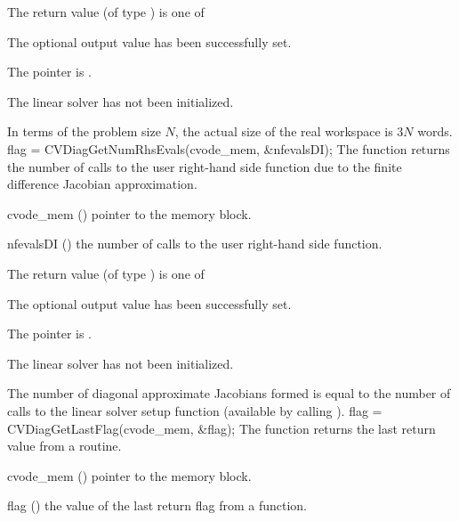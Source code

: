 {
  The return value  (of type ) is one of
  \begin{args}
  \item[\Id{CVDIAG\_SUCCESS}] 
    The optional output value has been successfully set.
  \item[\Id{CVDIAG\_MEM\_NULL}]
    The  pointer is .
  \item[\Id{CVDIAG\_LMEM\_NULL}]
    The {\cvdiag} linear solver has not been initialized.
  \end{args}
}
{
  In terms of the problem size $N$, the actual size of the real workspace
  is $3 N$  words.
}
{
  flag = CVDiagGetNumRhsEvals(cvode\_mem, \&nfevalsDI);
}
{
  The function  returns the
  number of calls to the user right-hand side function due to the 
  finite difference Jacobian approximation.
}
{
  \begin{args}
  \item[cvode\_mem] ()
    pointer to the {\cvode} memory block.
  \item[nfevalsDI] ()
    the number of calls to the user right-hand side function.
  \end{args}
}
{
  The return value  (of type ) is one of
  \begin{args}
  \item[\Id{CVDIAG\_SUCCESS}] 
    The optional output value has been successfully set.
  \item[\Id{CVDIAG\_MEM\_NULL}]
    The  pointer is .
  \item[\Id{CVDIAG\_LMEM\_NULL}]
    The {\cvdiag} linear solver has not been initialized.
  \end{args}
}
{
  The number of diagonal approximate Jacobians formed is
  equal to the number of calls to the linear solver setup function
  (available by calling ).
}
{
  flag = CVDiagGetLastFlag(cvode\_mem, \&flag);
}
{
  The function  returns the
  last return value from a {\cvdiag} routine. 
}
{
  \begin{args}
  \item[cvode\_mem] ()
    pointer to the {\cvode} memory block.
  \item[flag] ()
    the value of the last return flag from a {\cvdiag} function.
  \end{args}
}
